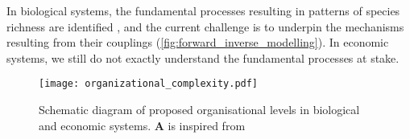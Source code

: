 % 
In biological systems, the fundamental processes resulting in patterns of species richness are identified \citep{Rahbek2019a,Rangel2018,Hagen}, and the current challenge is to underpin the mechanisms resulting from their couplings (\cref{fig:forward_inverse_modelling}).
% 
In economic systems, we still do not exactly understand the fundamental processes at stake. 
% 
% 
% 

\begin{figure}
    \centering
    \texttt{[image: organizational\_complexity.pdf]}
\caption{Schematic diagram of proposed organisational levels in biological and economic systems. \textbf{A} is inspired from \citep{Hendry+2016}}
\label{fig:organisational_levels}
\end{figure}






